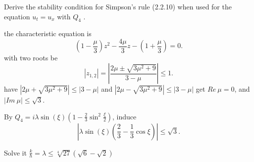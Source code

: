 \exc Derive the stability condition 
for Simpson’s rule (2.2.10) when used for
the equation $u_t = u_x$ with $Q_4$ .

\begin{solution}
 the characteristic equation is 
  \[(1 - \frac{\mu}{3}) z^2 - \frac{4 \mu}{3} z 
    - (1 + \frac{\mu}{3}) = 0. \]
    with two roots be 
    \[|z_{1, 2}| = |\frac{2\mu \pm \sqrt{3\mu^2 + 9}}
    {3 - \mu}| \leq 1 .\]
    have $|2\mu + \sqrt{3\mu^2 + 9}| \leq |3 - \mu|$ 
    and $ |2\mu - \sqrt{3\mu^2 + 9}| \leq |3 - \mu|$ get 
    $Re\ \mu = 0$, and $|Im\ \mu| \leq \sqrt{3}$.

    By $Q_4 = i \lambda \sin(\xi)(1 - \frac{2}{3} \sin^2 
    \frac{\xi}{2})$, induce 
    \[|\lambda \sin(\xi) (\frac{2}{3} - \frac{1}{3}
    \cos \xi)| \leq \sqrt{3}.\]

    Solve it $ \frac{k}{h} = \lambda \leq
     \sqrt[4]{27}(\sqrt{6} - \sqrt{2})$
    

\end{solution}
